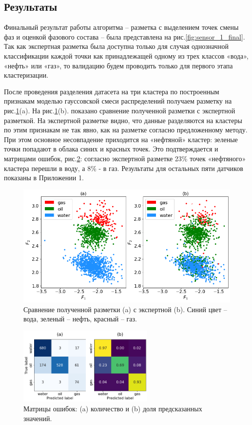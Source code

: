 \subsection{Результаты}
\par
Финальный результат работы алгоритма – разметка с выделением точек смены фаз и оценкой фазового состава – была представлена на рис.\ref{fig:sensor_1_final}. Так как экспертная разметка была доступна только для случая однозначной классификации каждой точки как принадлежащей одному из трех классов «вода», «нефть» или «газ», то валидацию будем проводить только для первого этапа кластеризации. 
\par
После проведения разделения датасета на три кластера по построенным признакам моделью гауссовской смеси распределений получаем разметку на рис.\ref{fig:expert_comparison}(a). На рис.\ref{fig:expert_comparison}(b). показано сравнение полученной разметки с экспертной разметкой. На экспертной разметке видно, что данные разделяются на кластеры по этим признакам не так явно, как на разметке согласно предложенному методу. 
При этом основное несовпадение приходится на «нефтяной» кластер: зеленые точки попадают в облака синих и красных точек.  Это подтверждается и матрицами ошибок, рис.\ref{fig:confusion_matrices}: согласно экспертной разметке 23\% точек «нефтяного» кластера перешли в воду, а 8\% - в газ. Результаты для остальных пяти датчиков показаны в Приложении 1.

\begin{figure}[H]
\centering
\includegraphics[width=1.0\textwidth]{TA/expert_comparison.png}
\caption{Сравнение полученной разметки (a) с экспертной (b). Синий цвет – вода, зеленый – нефть, красный – газ.}
\label{fig:expert_comparison}
\end{figure}

\begin{figure}[H]
\centering
\includegraphics[width=0.6\textwidth]{TA/confusion_matrices.png}
\caption{Матрицы ошибок: (a) количество и (b) доля предсказанных значений.}
\label{fig:confusion_matrices}
\end{figure}


